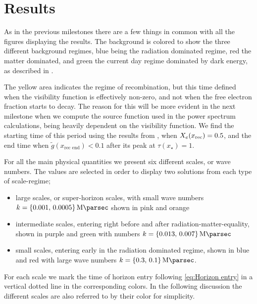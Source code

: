 \documentclass[10pt,a4paper]{article}
\begin{document}
\section{Results}
\label{sec:Results}
As in the previous milestones there are a few things in common with all the figures displaying the results. The background is colored to show the three different background regimes, blue being the radiation dominated regime, red the matter dominated, and green the current day regime dominated by dark energy, as described in \cite{milestone1}. 

The yellow area indicates the regime of recombination, but this time defined when the visibility function is effectively non-zero, and not when the free electron fraction starts to decay. The reason for this will be more evident in the next milestone when we compute the source function used in the power spectrum calculations, being heavily dependent on the visibility function. We find the starting time of this period using the results from \cite{milestone2}, when $X_e(x_{\rm{rec}}) = 0.5$, and the end time when $\tilde{g}(x_{\textrm{rec end}}) < 0.1$ after its peak at $\tau(x_\star) =1$.

For all the main physical quantities we present six different scales, or wave numbers. The values are selected in order to display two solutions from each type of scale-regime;
\begin{itemize}
  \item large scales, or super-horizon scales, with small wave numbers $k=\{0.001,\,0.0005\}\,\si{\per\mega\parsec}$ shown in pink and orange
  \item intermediate scales, entering right before and after radiation-matter-equality, shown in purple and green  with numbers $k=\{0.013,\,0.007\}\,\si{\per\mega\parsec}$
  \item small scales, entering early in the radiation dominated regime, shown in blue and red  with large wave numbers $k=\{0.3,\,0.1\}\,\si{\per\mega\parsec}$.
\end{itemize}
For each scale we mark the time of horizon entry following \cref{eq:Horizon entry} in a vertical dotted line in the corresponding colors. In the following discussion the different scales are also referred to by their color for simplicity.
\end{document}

